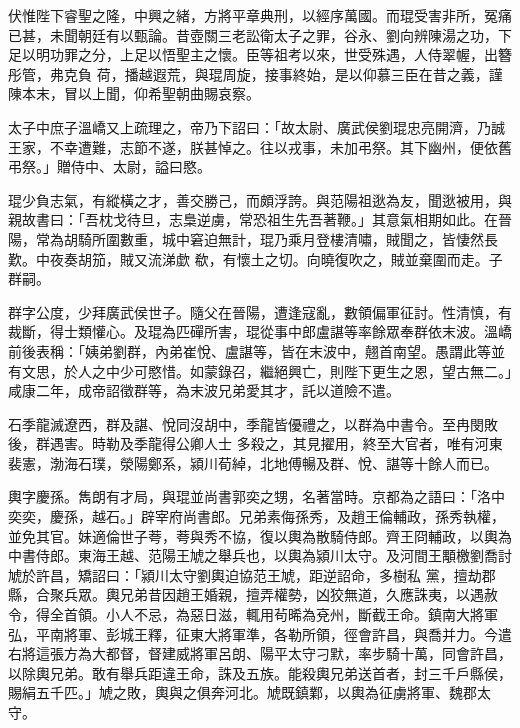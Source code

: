 \begin{pinyinscope}
 伏惟陛下睿聖之隆，中興之緒，方將平章典刑，以經序萬國。而琨受害非所，冤痛已甚，未聞朝廷有以甄論。昔壺關三老訟衛太子之罪，谷永、劉向辨陳湯之功，下足以明功罪之分，上足以悟聖主之懷。臣等祖考以來，世受殊遇，人侍翠幄，出簪彤管，弗克負
 荷，播越遐荒，與琨周旋，接事終始，是以仰慕三臣在昔之義，謹陳本末，冒以上聞，仰希聖朝曲賜哀察。



 太子中庶子溫嶠又上疏理之，帝乃下詔曰：「故太尉、廣武侯劉琨忠亮開濟，乃誠王家，不幸遭難，志節不遂，朕甚悼之。往以戎事，未加弔祭。其下幽州，便依舊弔祭。」贈侍中、太尉，謚曰愍。



 琨少負志氣，有縱橫之才，善交勝己，而頗浮誇。與范陽祖逖為友，聞逖被用，與親故書曰：「吾枕戈待旦，志梟逆虜，常恐祖生先吾著鞭。」其意氣相期如此。在晉陽，常為胡騎所圍數重，城中窘迫無計，琨乃乘月登樓清嘯，賊聞之，皆悽然長歎。中夜奏胡笳，賊又流涕歔
 欷，有懷土之切。向曉復吹之，賊並棄圍而走。子群嗣。



 群字公度，少拜廣武侯世子。隨父在晉陽，遭逢寇亂，數領偏軍征討。性清慎，有裁斷，得士類懽心。及琨為匹磾所害，琨從事中郎盧諶等率餘眾奉群依末波。溫嶠前後表稱：「姨弟劉群，內弟崔悅、盧諶等，皆在末波中，翹首南望。愚謂此等並有文思，於人之中少可愍惜。如蒙錄召，繼絕興亡，則陛下更生之恩，望古無二。」咸康二年，成帝詔徵群等，為末波兄弟愛其才，託以道險不遣。



 石季龍滅遼西，群及諶、悅同沒胡中，季龍皆優禮之，以群為中書令。至冉閔敗後，群遇害。時勒及季龍得公卿人士
 多殺之，其見擢用，終至大官者，唯有河東裴憲，渤海石璞，滎陽鄭系，潁川荀綽，北地傅暢及群、悅、諶等十餘人而已。



 輿字慶孫。雋朗有才局，與琨並尚書郭奕之甥，名著當時。京都為之語曰：「洛中奕奕，慶孫，越石。」辟宰府尚書郎。兄弟素侮孫秀，及趙王倫輔政，孫秀執權，並免其官。妹適倫世子荂，荂與秀不協，復以輿為散騎侍郎。齊王冏輔政，以輿為中書侍郎。東海王越、范陽王虓之舉兵也，以輿為潁川太守。及河間王顒檄劉喬討虓於許昌，矯詔曰：「潁川太守劉輿迫協范王虓，距逆詔命，多樹私
 黨，擅劫郡縣，合聚兵眾。輿兄弟昔因趙王婚親，擅弄權勢，凶狡無道，久應誅夷，以遇赦令，得全首領。小人不忌，為惡日滋，輒用茍晞為兗州，斷截王命。鎮南大將軍弘，平南將軍、彭城王釋，征東大將軍準，各勒所領，徑會許昌，與喬并力。今遣右將這張方為大都督，督建威將軍呂朗、陽平太守刁默，率步騎十萬，同會許昌，以除輿兄弟。敢有舉兵距違王命，誅及五族。能殺輿兄弟送首者，封三千戶縣侯，賜絹五千匹。」虓之敗，輿與之俱奔河北。虓既鎮鄴，以輿為征虜將軍、魏郡太守。




\end{pinyinscope}

